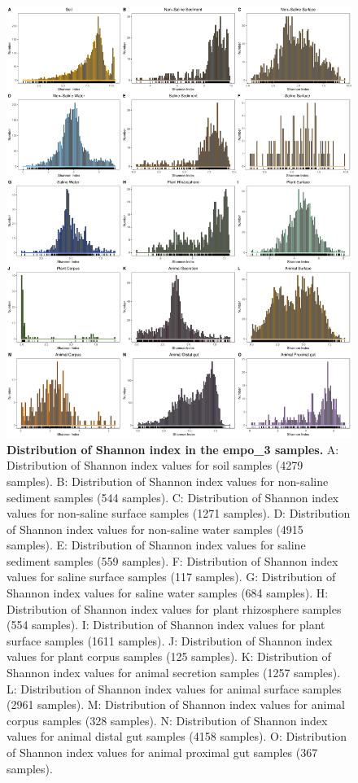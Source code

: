\begin{figure}[H]
    \centering
    \includegraphics[scale=0.33]{./Figures/Shan_hist_empo3}
    \caption{\textbf{Distribution of Shannon index in the empo\_3 samples.} A: Distribution of Shannon index values for soil samples (4279 samples). B: Distribution of Shannon index values for non-saline sediment samples (544 samples). C: Distribution of Shannon index values for non-saline surface samples (1271 samples). D: Distribution of Shannon index values for non-saline water samples (4915 samples). E: Distribution of Shannon index values for saline sediment samples (559 samples). F: Distribution of Shannon index values for saline surface samples (117 samples). G: Distribution of Shannon index values for saline water samples (684 samples). H: Distribution of Shannon index values for plant rhizosphere samples (554 samples). I: Distribution of Shannon index values for plant surface samples (1611 samples). J: Distribution of Shannon index values for plant corpus samples (125 samples). K: Distribution of Shannon index values for animal secretion samples (1257 samples). L: Distribution of Shannon index values for animal surface samples (2961 samples). M: Distribution of Shannon index values for animal corpus samples (328 samples). N: Distribution of Shannon index values for animal distal gut samples (4158 samples). O: Distribution of Shannon index values for animal proximal gut samples (367 samples).}
    \label{fig:Shan_hist3}
\end{figure}

